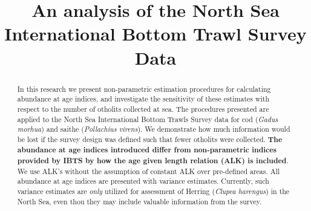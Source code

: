 \documentclass[a4paper 12pt]{article}
\title{\bf 
}
\author{}
\date{}
\numberwithin{equation}{section}
\begin{document}
\title{An analysis of the North Sea International Bottom Trawl Survey Data}

\maketitle


\begin{abstract}
In this research we present non-parametric estimation procedures for calculating abundance at age indices, and investigate the sensitivity of these estimates with respect to the number of otholits collected at sea. The procedures presented are applied to the North Sea International Bottom Trawls Survey data for cod (\textit{Gadus morhua}) and saithe (\textit{Pollachius virens}). We demonstrate how much information would be lost if the survey design was defined such that fewer otholits were collected. {\bf The abundance at age indices introduced differ from non-parametric indices provided by IBTS by how the age given length relation (ALK) is included}. We use ALK's without the assumption of constant ALK over pre-defined areas. All abundance at age indices are presented with variance estimates. Currently, such variance estimates are \textit{only} utilized for assessment of Herring (\textit{Clupea harengus}) in the North Sea, even thou they may include valuable information from the survey.

\end{abstract}
\end{document}
